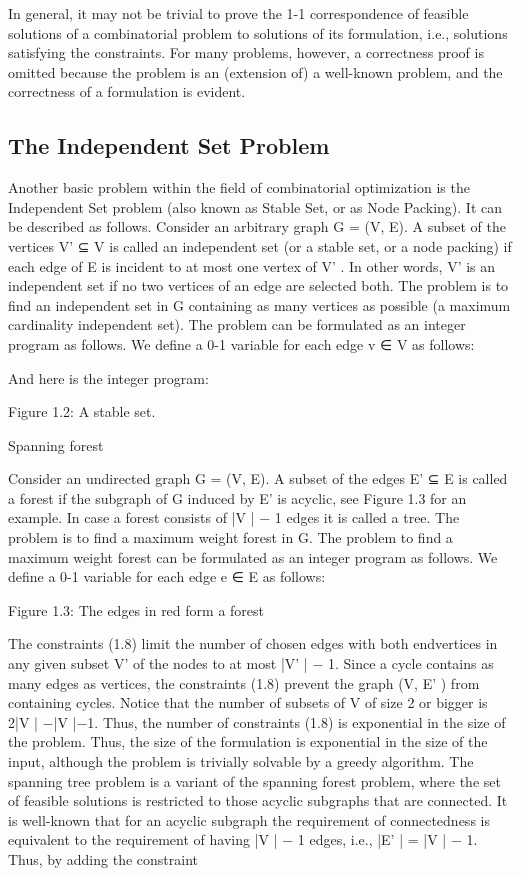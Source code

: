 \documentclass[titlepage]{book}
\begin{document}

In general, it may not be trivial to prove the 1-1 correspondence of feasible solutions of a combinatorial
problem to solutions of its formulation, i.e., solutions satisfying the constraints. For many problems,
however, a correctness proof is omitted because the problem is an (extension of) a well-known problem,
and the correctness of a formulation is evident.

\subsection{The Independent Set Problem}

Another basic problem within the field of combinatorial optimization is the Independent Set problem
(also known as Stable Set, or as Node Packing). It can be described as follows.
Consider an arbitrary graph G = (V, E). A subset of the vertices V' ⊆ V is called an independent set
(or a stable set, or a node packing) if each edge of E is incident to at most one vertex of V' . In other
words, V' is an independent set if no two vertices of an edge are selected both. The problem is to find an
independent set in G containing as many vertices as possible (a maximum cardinality independent set).
The problem can be formulated as an integer program as follows. We define a 0-1 variable for each edge
v ∈ V as follows:

And here is the integer program:


Figure 1.2: A stable set.


Spanning forest

Consider an undirected graph G = (V, E). A subset of the edges E' ⊆ E is called a forest if the subgraph
of G induced by E' is acyclic, see Figure 1.3 for an example. In case a forest consists of |V | − 1 edges it
is called a tree. The problem is to find a maximum weight forest in G.
The problem to find a maximum weight forest can be formulated as an integer program as follows. We
define a 0-1 variable for each edge e ∈ E as follows:


Figure 1.3: The edges in red form a forest


The constraints (1.8) limit the number of chosen edges with both endvertices in any given subset V' of
the nodes to at most |V' | − 1. Since a cycle contains as many edges as vertices, the constraints (1.8)
prevent the graph (V, E' ) from containing cycles.
Notice that the number of subsets of V of size 2 or bigger is 2|V | −|V |−1. Thus, the number of constraints
(1.8) is exponential in the size of the problem. Thus, the size of the formulation is exponential in the size
of the input, although the problem is trivially solvable by a greedy algorithm.
The spanning tree problem is a variant of the spanning forest problem, where the set of feasible solutions is
restricted to those acyclic subgraphs that are connected. It is well-known that for an acyclic subgraph the
requirement of connectedness is equivalent to the requirement of having |V | − 1 edges, i.e., |E' | = |V | − 1.
Thus, by adding the constraint
\end{document}
